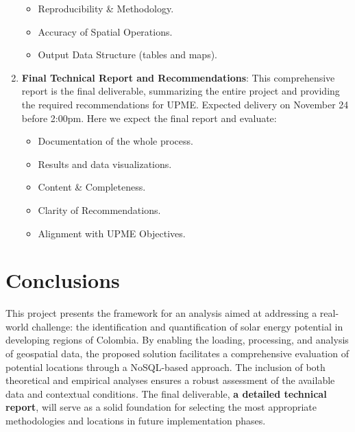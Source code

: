 \documentclass[12pt]{article}
\begin{document}
\begin{enumerate}
  \begin{itemize}
    \item Reproducibility \& Methodology.
    \item Accuracy of Spatial Operations.
    \item Output Data Structure (tables and maps).
  \end{itemize}

  \item \textbf{Final Technical Report and Recommendations}: This comprehensive report is the final deliverable, summarizing the entire project and providing the required recommendations for UPME. Expected delivery on November 24 before 2:00pm. Here we expect the final report and evaluate:

  \begin{itemize}
    \item Documentation of the whole process.
    \item Results and data visualizations.
    \item Content \& Completeness.
    \item Clarity of Recommendations.
    \item Alignment with UPME Objectives.
  \end{itemize}
\end{enumerate}

\section{Conclusions}

This project presents the framework for an analysis aimed at addressing a real-world challenge: the identification and quantification of solar energy potential in developing regions of Colombia. By enabling the loading, processing, and analysis of geospatial data, the proposed solution facilitates a comprehensive evaluation of potential locations through a NoSQL-based approach. The inclusion of both theoretical and empirical analyses ensures a robust assessment of the available data and contextual conditions. The final deliverable, \textbf{a detailed technical report}, will serve as a solid foundation for selecting the most appropriate methodologies and locations in future implementation phases.
\end{document}

